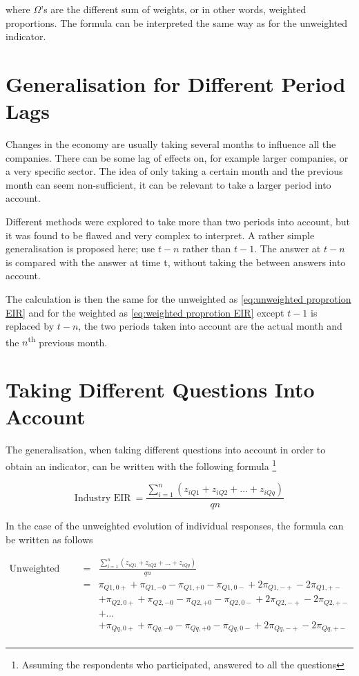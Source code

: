 \documentclass[12pt,a4paper,oneside]{book}
\begin{document}
where $\Omega$'s are the different sum of weights, or in other words, weighted proportions.
The formula can be interpreted the same way as for the unweighted indicator.


\section{Generalisation for Different Period Lags}
\label{sec:EIR lg longer period into account}

Changes in the economy are usually taking several months to influence all the companies. There can be some lag of effects on, for example larger companies, or a very specific sector.
The idea of only taking a certain month and the previous month can seem non-sufficient, it can be relevant to take a larger period into account.

Different methods were explored to take more than two periods into account, but it was found to be flawed and very complex to interpret.
A rather simple generalisation is proposed here; use $t-n$ rather than $t-1$. 
The answer at $t-n$ is compared with the answer at time t, without taking the between answers into account.

The calculation is then the same for the unweighted as \autoref{eq:unweighted proprotion EIR} and for the weighted as \autoref{eq:weighted proprotion EIR} except $t-1$ is replaced by $t-n$, the two periods taken into account are the actual month and the $n$\textsuperscript{th} previous month.


\section{Taking Different Questions Into Account}

The generalisation, when taking different questions into account in order to obtain an indicator, can be written with the following formula \footnote{Assuming the respondents who participated, answered to all the questions}

\begin{equation}
    \mbox{Industry EIR}\ = \frac{\sum_{i=1}^n \left(z_{i Q1} + z_{i Q2} + \ldots + z_{i Qq} \right)}{qn}
\end{equation}


In the case of the unweighted evolution of individual responses, the formula can be written as follows

\begin{eqnarray}
\mbox{Unweighted EIR}\ &=& \frac{\sum_{i=1}^n \left(z_{i Q1} + z_{i Q2} + \ldots + z_{i Qq} \right)}{qn} \nonumber \\
&=&    \pi_{Q1,0+} + \pi_{Q1,-0} - \pi_{Q1,+0} - \pi_{Q1,0-} +2 \pi_{Q1,-+} -2\pi_{Q1,+-} \nonumber \\
&&    + \pi_{Q2,0+} + \pi_{Q2,-0} - \pi_{Q2,+0} - \pi_{Q2,0-} +2 \pi_{Q2,-+} -2\pi_{Q2,+-} \nonumber \\
&&	 + \ldots \nonumber \\
&&   + \pi_{Qq,0+} + \pi_{Qq,-0} - \pi_{Qq,+0} - \pi_{Qq,0-} +2 \pi_{Qq,-+} -2\pi_{Qq,+-} \nonumber \\
\end{eqnarray}
\end{document}
